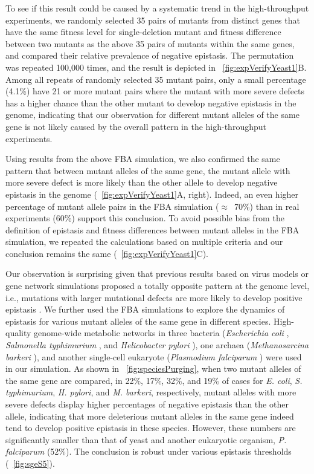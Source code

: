 To see if this result could be caused by a systematic trend in the
high-throughput experiments, we randomly selected 35 pairs of mutants
from distinct genes that have the same fitness level for
single-deletion mutant and fitness difference between two mutants as
the above 35 pairs of mutants within the same genes, and compared
their relative prevalence of negative epistasis. The permutation was
repeated 100,000 times, and the result is depicted in
\Fig~\ref{fig:expVerifyYeast1}B. Among all repeats of randomly
selected 35 mutant pairs, only a small
percentage (4.1\%) have 21 or more mutant pairs where the mutant with
more severe defects has a higher chance than the other mutant to
develop negative epistasis in the genome, indicating that our
observation for different mutant alleles of the same gene is not
likely caused by the overall pattern in the high-throughput
experiments.

Using results from the above FBA simulation, we also confirmed the
same pattern that between mutant alleles of the same gene, the mutant
allele with more severe defect is more likely than the other allele to
develop negative epistasis in the genome
(\Fig~\ref{fig:expVerifyYeast1}A, right). Indeed, an even higher
percentage of mutant allele pairs in the FBA simulation
($\approx$~70\%) than in real experiments (60\%) support this
conclusion. To avoid possible bias from the definition of epistasis
and fitness differences between mutant alleles in the FBA simulation,
we repeated the calculations based on multiple criteria and our
conclusion remains the same (\Fig~\ref{fig:expVerifyYeast1}C).

Our observation is surprising given that previous results based on
virus models or gene network simulations proposed a totally opposite
pattern at the genome level, i.e., mutations with larger mutational
defects are more likely to develop positive epistasis \citep{Burch2004, 
You2002, Sanjuan2006a, Azevedo2006, Lohaus2010}. We
further used the FBA simulations to explore the dynamics of epistasis
for various mutant alleles of the same gene in different
species. High-quality genome-wide metabolic networks in three bacteria
(\textit{Escherichia coli} \citep{Feist2007}, \textit{Salmonella typhimurium} \citep{Thiele2011},
and \textit{Helicobacter pylori} \citep{Thiele2005}), one archaea
(\textit{Methanosarcina barkeri} \citep{Feist2006}), and another single-cell
eukaryote (\textit{Plasmodium falciparum} \citep{Plata2010}) were used in our
simulation. As shown in \Fig~\ref{fig:speciesPurging}, when two mutant alleles of the same
gene are compared, in 22\%, 17\%, 32\%, and 19\% of cases for
\textit{E. coli}, \textit{S. typhimurium}, \textit{H. pylori}, and
\textit{M. barkeri}, respectively, mutant
alleles with more severe defects display higher percentages of
negative epistasis than the other allele, indicating that more
deleterious mutant alleles in the same gene indeed tend to develop
positive epistasis in these species. However, these numbers are
significantly smaller than that of yeast and another eukaryotic
organism, \textit{P. falciparum} (52\%). The conclusion is robust
under various epistasis thresholds (\Fig~\ref{fig:sgeS5}).

